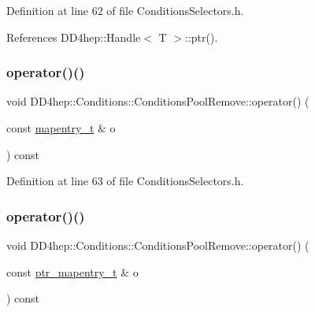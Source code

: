 Definition at line 62 of file Conditions\+Selectors.\+h.



References D\+D4hep\+::\+Handle$<$ T $>$\+::ptr().

\hypertarget{class_d_d4hep_1_1_conditions_1_1_conditions_pool_remove_a7e5a8677d8ceeaed7a5bb0b1b1e2ff68}{}\label{class_d_d4hep_1_1_conditions_1_1_conditions_pool_remove_a7e5a8677d8ceeaed7a5bb0b1b1e2ff68} 
\subsubsection{\texorpdfstring{operator()()}{operator()()}\hspace{0.1cm}{\footnotesize\ttfamily [3/4]}}
{\footnotesize\ttfamily void D\+D4hep\+::\+Conditions\+::\+Conditions\+Pool\+Remove\+::operator() (\begin{DoxyParamCaption}\item[{const \hyperlink{class_d_d4hep_1_1_conditions_1_1_cond_____oper_a877dac3da66795207aed15be219acbdc}{mapentry\+\_\+t} \&}]{o }\end{DoxyParamCaption}) const\hspace{0.3cm}{\ttfamily [inline]}}



Definition at line 63 of file Conditions\+Selectors.\+h.

\hypertarget{class_d_d4hep_1_1_conditions_1_1_conditions_pool_remove_adaffcc5aeb240c7539e89a080fb3ee9f}{}\label{class_d_d4hep_1_1_conditions_1_1_conditions_pool_remove_adaffcc5aeb240c7539e89a080fb3ee9f} 
\subsubsection{\texorpdfstring{operator()()}{operator()()}\hspace{0.1cm}{\footnotesize\ttfamily [4/4]}}
{\footnotesize\ttfamily void D\+D4hep\+::\+Conditions\+::\+Conditions\+Pool\+Remove\+::operator() (\begin{DoxyParamCaption}\item[{const \hyperlink{class_d_d4hep_1_1_conditions_1_1_cond_____oper_a0949e4bd5f90cd3fae2394cf30983973}{ptr\+\_\+mapentry\+\_\+t} \&}]{o }\end{DoxyParamCaption}) const\hspace{0.3cm}{\ttfamily [inline]}}



